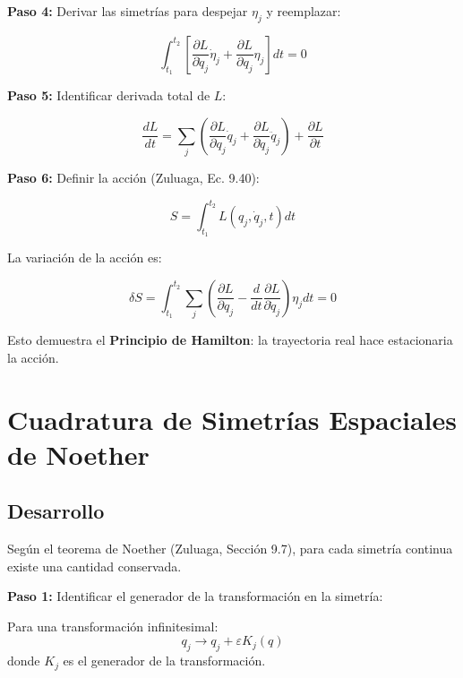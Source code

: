 \documentclass[a4paper]{article}
\begin{document}
\textbf{Paso 4:} Derivar las simetrías para despejar $\eta_j$ y reemplazar:

\begin{equation}
\int_{t_1}^{t_2} \left[\frac{\partial L}{\partial \dot{q}_j}\dot{\eta}_j + \frac{\partial L}{\partial q_j}\eta_j\right] dt = 0
\end{equation}

\textbf{Paso 5:} Identificar derivada total de $L$:

\begin{equation}
\frac{dL}{dt} = \sum_j \left(\frac{\partial L}{\partial q_j}\dot{q}_j + \frac{\partial L}{\partial \dot{q}_j}\ddot{q}_j\right) + \frac{\partial L}{\partial t}
\end{equation}

\textbf{Paso 6:} Definir la acción (Zuluaga, Ec. 9.40):

\begin{equation}
S = \int_{t_1}^{t_2} L(q_j, \dot{q}_j, t) dt
\end{equation}

La variación de la acción es:

\begin{equation}
\delta S = \int_{t_1}^{t_2} \sum_j \left(\frac{\partial L}{\partial q_j} - \frac{d}{dt}\frac{\partial L}{\partial \dot{q}_j}\right)\eta_j dt = 0
\end{equation}

Esto demuestra el \textbf{Principio de Hamilton}: la trayectoria real hace estacionaria la acción.

\section{Cuadratura de Simetrías Espaciales de Noether}

\subsection*{Desarrollo}

Según el teorema de Noether (Zuluaga, Sección 9.7), para cada simetría continua existe una cantidad conservada.

\textbf{Paso 1:} Identificar el generador de la transformación en la simetría:

Para una transformación infinitesimal:
\begin{equation}
q_j \rightarrow q_j + \varepsilon K_j(q)
\end{equation}
donde $K_j$ es el generador de la transformación.
\end{document}
